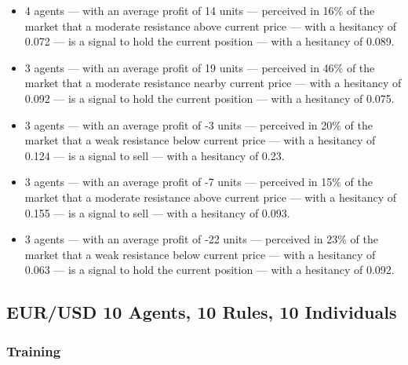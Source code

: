{\small
  \begin{itemize}
  \item 4 agents — with an average profit of 14 units — perceived in 16\% of the
    market that a moderate resistance above current price — with a hesitancy of
    0.072 — is a signal to hold the current position — with a hesitancy of
    0.089.
  \item 3 agents — with an average profit of 19 units — perceived in 46\% of the
    market that a moderate resistance nearby current price — with a hesitancy of
    0.092 — is a signal to hold the current position — with a hesitancy of
    0.075.
  \item 3 agents — with an average profit of -3 units — perceived in 20\% of the
    market that a weak resistance below current price — with a hesitancy of
    0.124 — is a signal to sell — with a hesitancy of 0.23.
  \item 3 agents — with an average profit of -7 units — perceived in 15\% of the
    market that a moderate resistance above current price — with a hesitancy of
    0.155 — is a signal to sell — with a hesitancy of 0.093.
  \item 3 agents — with an average profit of -22 units — perceived in 23\% of
    the market that a weak resistance below current price — with a hesitancy of
    0.063 — is a signal to hold the current position — with a hesitancy of
    0.092.
  \end{itemize}
}

\subsection{EUR/USD 10 Agents, 10 Rules, 10 Individuals}
\label{results:interpretation-eur-usd-10agents-10rules-10individuals}


\subsubsection{Training}

